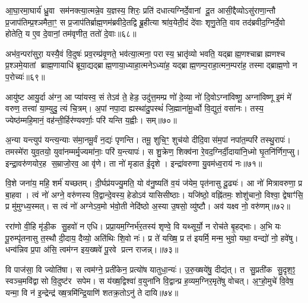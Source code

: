 आ॒घा॒रमा॒घार्य॑ ध्रु॒वा सम॑नक्त्या॒त्मन्ने॒व य॒ज्ञस्य॒ शिरः॒ प्रति॑ दधात्यग्निर्दे॒वानां दू॒त आसी॒द्दैव्योऽसु॑राणा॒न्तौ प्र॒जाप॑तिम्प्र॒श्ञमैता॒ꣳ॒ स प्र॒जाप॑तिर्ब्राह्म॒णम॑ब्रवीदे॒तद्वि ब्रू॒हीत्या श्रा॑व॒येती॒दं दे॑वाः शृणु॒तेति॒ वाव तद॑ब्रवीद॒ग्निर्दे॒वो होतेति॒ य ए॒व दे॒वानां॒ तम॑वृणीत॒ ततो॑ दे॒वाः॥६८॥

अभ॑व॒न्परा॑सुरा॒ यस्यै॒वं वि॒दुषः॑ प्रव॒रम्प्र॑वृ॒णते॒ भव॑त्या॒त्मना॒ परास्य॒ भ्रातृ॑व्यो भवति॒ यद्ब्राह्म॒णश्चाब्राह्मणश्च प्र॒श्ञमे॒यातां ब्राह्म॒णायाधि॑ ब्रूया॒द्यद्ब्राह्म॒णाया॒ध्याहा॒त्मनेऽध्या॑ह॒ यद्ब्राह्म॒णम्प॒राहा॒त्मन॒म्परा॑ह॒ तस्माद्ब्राह्म॒णो न प॒रोच्यः॑॥६९॥

{\anuvakamend[{वा आ॑र॒ण्याश्चाव॑ रु॒न्धेऽथो॑ प॒शुभिः॒ सोऽब्रवीद्दख्षिणा॒र्ध्य॑न्त्रय॑ इव ध्रु॒वा दे॒वाश्च॑त्वारि॒ꣳ॒शच्च॑॥11॥}]}

आयु॑ष्ट आयु॒र्दा अ॑ग्न॒ आ प्या॑यस्व॒ सं तेऽव॑ ते॒ हेड॒ उदु॑त्त॒मम्प्र णो॑ दे॒व्या नो॑ दि॒वोऽग्ना॑विष्णू॒ अग्ना॑विष्णू इ॒मं मे॑ वरुण॒ तत्त्वा॑ या॒म्युदु॒ त्यं चि॒त्रम्। अ॒पां नपा॒दा ह्यस्था॑दु॒पस्थं॑ जि॒ह्माना॑मू॒र्ध्वो वि॒द्युतं॒ वसा॑नः। तस्य॒ ज्येष्ठ॑म्महि॒मानं॒ वह॑न्ती॒र्\mbox{}हिर॑ण्यवर्णाः॒ परि॑ यन्ति य॒ह्वीः। सम्॥७०॥

अ॒न्या यन्त्युप॑ यन्त्य॒न्याः स॑मा॒नमू॒र्वं न॒द्यः॑ पृणन्ति। तमू॒ शुचि॒ꣳ॒ शुच॑यो दीदि॒वास॑म॒पां नपा॑त॒म्परि॑ तस्थु॒रापः॑। तमस्मे॑रा युव॒तयो॒ युवा॑नम्मर्मृ॒ज्यमा॑नाः॒ परि॑ य॒न्त्यापः॑। स शु॒क्रेण॒ शिक्व॑ना रे॒वद॒ग्निर्दी॒दाया॑नि॒ध्मो घृ॒तनि॑र्णिग॒प्सु। इन्द्रा॒वरु॑णयोर॒ह स॒म्राजो॒रव॒ आ वृ॑णे। ता नो॑ मृडात ई॒दृशे। इन्द्रा॑वरुणा यु॒वम॑ध्व॒राय॑ नः॥७१॥

वि॒शे जना॑य॒ महि॒ शर्म॑ यच्छतम्। दी॒र्घप्र॑यज्यु॒मति॒ यो व॑नु॒ष्यति॑ व॒यं ज॑येम॒ पृत॑नासु दू॒ढ्यः॑। आ नो॑ मित्रावरुणा॒ प्र बा॒हवा। त्वं नो॑ अग्ने॒ वरु॑णस्य वि॒द्वान्दे॒वस्य॒ हेडोऽव॑ यासिसीष्ठाः। यजि॑ष्ठो॒ वह्नि॑तमः॒ शोशु॑चानो॒ विश्वा॒ द्वेषाꣳ॑सि॒ प्र मु॑मुग्ध्य॒स्मत्। स त्वं नो॑ अग्नेऽव॒मो भ॑वो॒ती नेदि॑ष्ठो अ॒स्या उ॒षसो॒ व्यु॑ष्टौ। अव॑ यक्ष्व नो॒ वरु॑णम्॥७२॥

ररा॑णो वी॒हि मृ॑डी॒क सु॒हवो॑ न एधि। प्रप्रा॒यम॒ग्निर्भ॑र॒तस्य॑ शृण्वे॒ वि यथ्सूर्यो॒ न रोच॑ते बृ॒हद्भाः। अ॒भि यः पू॒रुम्पृ॑तनासु त॒स्थौ दी॒दाय॒ दैव्यो॒ अति॑थिः शि॒वो नः॑। प्र ते॑ यख्षि॒ प्र त॑ इयर्मि॒ मन्म॒ भुवो॒ यथा॒ वन्द्यो॑ नो॒ हवे॑षु। धन्व॑न्निव प्र॒पा अ॑सि॒ त्वम॑ग्न इय॒ख्षवे॑ पू॒रवे प्रत्न राजन्न्।॥७३॥

वि पाज॑सा॒ वि ज्योति॑षा। स त्वम॑ग्ने॒ प्रती॑केन॒ प्रत्यो॑ष यातुधा॒न्यः॑। उ॒रु॒ख्षये॑षु॒ दीद्य॑त्। त सु॒प्रती॑क सु॒दृश॒ꣵ॒ स्वञ्च॒मवि॑द्वासो वि॒दुष्ट॑र सपेम। स य॑ख्ष॒द्विश्वा॑ व॒युना॑नि वि॒द्वान्प्र ह॒व्यम॒ग्निर॒मृते॑षु वोचत्। अ॒ꣳ॒हो॒मुचे॑ वि॒वेष॒ यन्मा॒ वि न॑ इ॒न्द्रेन्द्र॑ ख्ष॒त्रमि॑न्द्रि॒याणि॑ शतक्र॒तोऽनु॑ ते दायि॥७४॥

